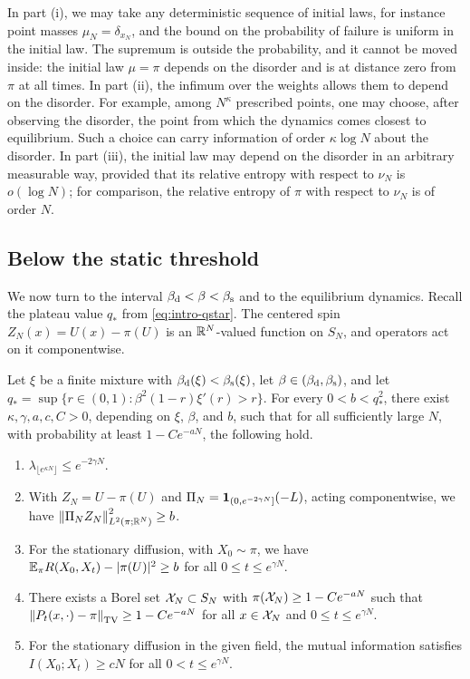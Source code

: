 In part (i), we may take any deterministic sequence of initial laws, for instance point masses $\mu_N=\delta_{x_N}$, and the bound on the probability of failure is uniform in the initial law. The supremum is outside the probability, and it cannot be moved inside: the initial law $\mu=\pi$ depends on the disorder and is at distance zero from $\pi$ at all times. In part (ii), the infimum over the weights allows them to depend on the disorder. For example, among $N^\kappa$ prescribed points, one may choose, after observing the disorder, the point from which the dynamics comes closest to equilibrium. Such a choice can carry information of order $\kappa\log N$ about the disorder. In part (iii), the initial law may depend on the disorder in an arbitrary measurable way, provided that its relative entropy with respect to $\nu_N$ is $o(\log N)$; for comparison, the relative entropy of $\pi$ with respect to $\nu_N$ is of order $N$.

\subsection{Below the static threshold}\label{sec:intro-prestatic}

We now turn to the interval $\beta_{\mathrm d}<\beta<\beta_{\mathrm s}$ and to the equilibrium dynamics. Recall the plateau value $q_*$ from \eqref{eq:intro-qstar}. The centered spin $Z_N(x)=U(x)-\pi(U)$ is an $\mathbb R^N$-valued function on $S_N$, and operators act on it componentwise.

\begin{theorem}\label{thm:main-memory}
Let $\xi$ be a finite mixture with $\beta_{\mathrm d}(\xi)<\beta_{\mathrm s}(\xi)$, let $\beta\in(\beta_{\mathrm d},\beta_{\mathrm s})$, and let $q_*=\sup\{r\in(0,1):\beta^2(1-r)\xi'(r)>r\}$. For every $0<b<q_*^2$, there exist $\kappa,\gamma,a,c,C>0$, depending on $\xi$, $\beta$, and $b$, such that for all sufficiently large $N$, with probability at least $1-Ce^{-aN}$, the following hold.
\begin{enumerate}[label=(\roman*)]
\item $\lambda_{\lfloor e^{\kappa N}\rfloor}\le e^{-2\gamma N}$.
\item With $Z_N=U-\pi(U)$ and $\Pi_N=\mathbf 1_{(0,e^{-2\gamma N}]}(-L)$, acting componentwise, we have $\left\lVert\Pi_NZ_N\right\rVert_{L^2(\pi;\mathbb R^N)}^2\ge b$.
\item For the stationary diffusion, with $X_0\sim\pi$, we have $\mathbb E_\pi R(X_0,X_t)-|\pi(U)|^2\ge b$ for all $0\le t\le e^{\gamma N}$.
\item There exists a Borel set $\mathcal X_N\subset S_N$ with $\pi(\mathcal X_N)\ge1-Ce^{-aN}$ such that $\left\lVert P_t(x,\cdot)-\pi\right\rVert_{\mathrm{TV}}\ge1-Ce^{-aN}$ for all $x\in\mathcal X_N$ and $0\le t\le e^{\gamma N}$.
\item For the stationary diffusion in the given field, the mutual information satisfies $I(X_0;X_t)\ge cN$ for all $0<t\le e^{\gamma N}$.
\end{enumerate}
\end{theorem}

